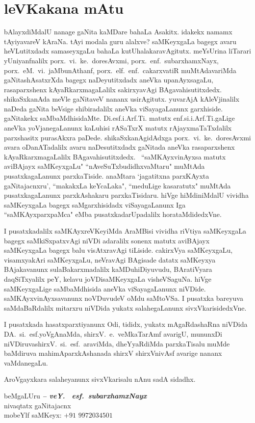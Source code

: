 \chapter*{leVKakana mAtu}
\vskip -25pt

bAlayxdiMdalU nanage gaNita kaMDare bahaLa Asakitx. idakekx namamx tAyiyavareV kAraNa. tAyi modala 
guru alalxve? saMKeyxgaLa bagegx avaru heVLutitxdadx samaseyxgaLu bahaLa kutUhalakaravAgitutx. 
meYsUrina liTarari yUniyanfnalilx porx.\ vi.~ke.\ doresAvxmi, porx.\ enf.\ subarxhamxNayx, 
porx.\ eM.\ vi.\ jaMbunAthanf, porx.\ elf.~enf.~cakarxvatiR muMtAdavariMda gaNitashAsatxrXda bagegx    naDeyutitxdadx aneVka upanAyxsagaLu, rasaparxshenx kAyaR\-karxmagaLalilx sakirxyavAgi BAgavahisutitxdedx. shikaSxkanAda meVle gaNitaveV nananx usirAgitutx. yuvarAjA kAleVjinalilx naDeda gaNita beVsige shibiradalilx aneVka viSayagaLanunx garxhiside. gaNitakekx saMbaMdhisidaMte. Di.esf.i.Arf.Ti. matutx enf.si.i.Arf.Ti.gaLige aneVka yoVjanegaLanunx kaLuhisi rASaTxrX matutx rAjayx\-maTaTxdalilx parxshasitx purasAkxra paDede. shikaSxkanAgidAdxga porx.~vi.~ke.\ doresAvxmi avara oDanATadalilx avaru naDesutitxdadx gaNitada aneVka rasaparxshenx kAyaRkarxmagaLalilx BAgavahisutitxdedx. ~``saMKAyxvinAyxsa matutx aviBAjayx saMKeyxgaLu" ``nAveSuTx\-budidhxvaMtaru" muMtAda pusatxkagaLanunx parxkaTiside. anaMtara `jagatitxna parxKAyxta gaNitajacnxru', ``makakxLa keYcaLaka", ``meduLige kasaratutx" muMtAda pusatxkagaLanunx parxkAshakaru parxkaTisidaru. hiVge hiMdiniMdalU vividha saMKeyxgaLa bagegx saMgarxhisidadx viSayagaLanunx Iga ``saMKAyxparxpaMca" eMba pusatxkadarUpadalilx horataMdidedxVne. 

I pusatxkadalilx saMKAyxreVKeyiMda AraMBisi vividha riVtiya saMKeyxgaLa bagegx saMkiSxpatxvAgi niVDi adaralilx sonenx matutx aviBAjayx saMKeyxgaLa bagegx balu visAtxravAgi tiLiside. cakirxVya saMKeyxgaLu, visamxyakAri saMKeyxgaLu, neVravAgi BAgisade datatx saMKeyxya BAjakavanunx sulaBakarxmadalilx kaMDuhiDiyuvudu, BAratiVyara daqSiTxyalilx peY, kelavu joVDisaMKeyxgaLa visheVSaguNa. hiVge saMKeyxgaLige saMbaMdhisida aneVka viSayagaLanunx niVDide. saMKAyxvinAyxsavanunx noVDuvudeV oMdu saMtoVSa. I pusatxka bareyuva saMdaBaRdalilx mitarxru niVDida yukatx salahegaLanunx sivxVkarisidedxVne.

I pusatxkada hasatxparxtiyanunx Odi, tididx, yukatx mAgaRdashaRna niVDida DA.~si.~esf.\break yoVgAnaMda, shirxV.~e.~veMkaTarAmf avarigU, mununxDi niVDiruva\break shirxV.~si.~esf.~araviMda, dheYyaRdiMda parxkaTisalu muMde baMdiruva mahimA\break parxkAshanada shirxV shirxVnivAsf avarige nananx vaMdanegaLu.

AroVgayxkara salaheyanunx sivxVkarisalu nAnu sadA sidadhx.

\medskip

\begin{flushright}
beMgaLUru \hfill {\sl\bfseries {\rm --} veY. ~esf.\ subarxhamxNayx}\hfill\\
nivaqtatx gaNitajacnx\\
mobeYlf saMKeyx: $+91$ $9972034501$
\end{flushright}

